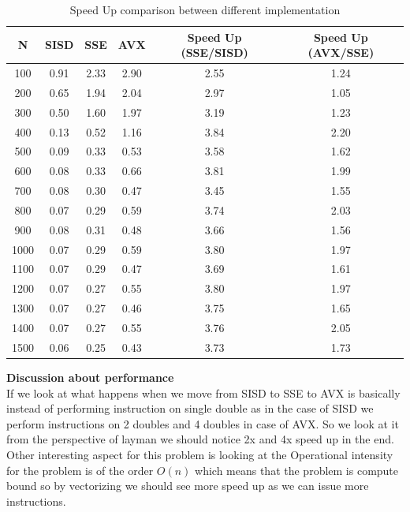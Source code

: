 \documentclass[letterpaper, 11pt]{article}
\begin{document}
\begin{table}[]
\centering
\label{table1}
\begin{tabular}{|c|c|c|c|c|c|}
\hline
N    & SISD      & SSE      & AVX      & Speed Up (SSE/SISD) & Speed Up (AVX/SSE) \\ \hline
100  & 0.91 & 2.33 & 2.90 & 2.55         & 1.24        \\ \hline
200  & 0.65 & 1.94 & 2.04 & 2.97         & 1.05        \\ \hline
300  & 0.50 & 1.60 & 1.97 & 3.19         & 1.23        \\ \hline
400  & 0.13 & 0.52 & 1.16 & 3.84         & 2.20        \\ \hline
500  & 0.09 & 0.33 & 0.53 & 3.58         & 1.62        \\ \hline
600  & 0.08 & 0.33 & 0.66 & 3.81         & 1.99        \\ \hline
700  & 0.08 & 0.30 & 0.47 & 3.45         & 1.55        \\ \hline
800  & 0.07 & 0.29 & 0.59 & 3.74         & 2.03        \\ \hline
900  & 0.08 & 0.31 & 0.48 & 3.66         & 1.56        \\ \hline
1000 & 0.07 & 0.29 & 0.59 & 3.80         & 1.97        \\ \hline
1100 & 0.07 & 0.29 & 0.47 & 3.69         & 1.61        \\ \hline
1200 & 0.07 & 0.27 & 0.55 & 3.80         & 1.97        \\ \hline
1300 & 0.07 & 0.27 & 0.46 & 3.75         & 1.65        \\ \hline
1400 & 0.07 & 0.27 & 0.55 & 3.76         & 2.05        \\ \hline
1500 & 0.06 & 0.25 & 0.43 & 3.73         & 1.73        \\ \hline
\end{tabular}
\caption{Speed Up comparison between different implementation}
\end{table}
\textbf{Discussion about performance}\\
If we look at what happens when we move from SISD to SSE to AVX is basically instead of performing instruction on single double as in the case of SISD we perform instructions on 2 doubles and 4 doubles in case of AVX. So we look at it from the perspective of layman we should notice 2x and 4x speed up in the end. Other interesting aspect for this problem is looking at the Operational intensity for the problem is of the order $O(n)$ which means that the problem is compute bound so by vectorizing we should see more speed up as we can issue more instructions.
\end{document}
